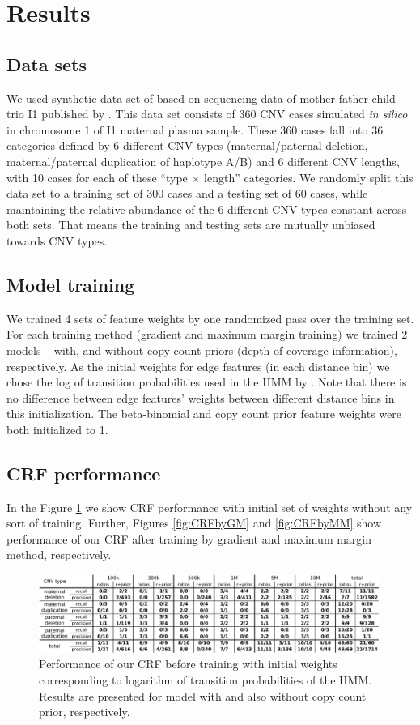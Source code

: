 \section{Results}

\subsection{Data sets}
We used synthetic data set of \cite{rampasek2014fcnv} based on sequencing data of mother-father-child trio I1 published by \cite{kitzman2012}. This data set consists of 360 CNV cases simulated \textit{in silico} in chromosome 1 of I1 maternal plasma sample. These 360 cases fall into 36 categories defined by 6 different CNV types (maternal/paternal deletion, maternal/paternal duplication of haplotype A/B) and 6 different CNV lengths, with 10 cases for each of these ``type $\times$ length'' categories. We randomly split this data set to a training set of 300 cases and a testing set of 60 cases, while maintaining the relative abundance of the 6 different CNV types constant across both sets. That means the training and testing sets are mutually unbiased towards CNV types.

\subsection{Model training}
We trained 4 sets of feature weights by one randomized pass over the training set. For each training method (gradient and maximum margin training) we trained 2 models -- with, and without copy count priors (depth-of-coverage information), respectively. As the initial weights for edge features (in each distance bin) we chose the log of transition probabilities used in the HMM by \cite{rampasek2014fcnv}. Note that there is no difference between edge features' weights between different distance bins in this initialization. The beta-binomial and copy count prior feature weights were both initialized to 1.

\subsection{CRF performance}
In the Figure \ref{fig:CRFinit} we show CRF performance with initial set of weights without any sort of training. Further, Figures \ref{fig:CRFbyGM} and \ref{fig:CRFbyMM} show performance of our CRF after training by gradient and maximum margin method, respectively.

\begin{figure}
\caption{Performance of our CRF before training with initial weights corresponding to logarithm of transition probabilities of the HMM. Results are presented for model with and also without copy count prior, respectively.}
\label{fig:CRFinit}
\centering
\includegraphics[width=0.99\textwidth]{figures/crf_initial_w}
\end{figure}

